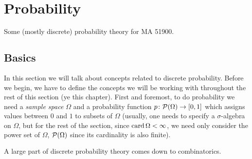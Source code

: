 \chapter{Probability}
Some (mostly discrete) probability theory for MA 51900.

\section{Basics}
In this section we will talk about concepts related to discrete
probability. Before we begin, we have to define the concepts we will be
working with throughout the rest of this section (ye this chapter). First
and foremost, to do probability we need a \emph{sample space \(\Omega\)}
and a probability function \(p\colon\mathcal{P}(\Omega)\to[0,1]\) which assigns
values between \(0\) and \(1\) to subsets of \(\Omega\) (usually, one needs
to specify a \(\sigma\)-algebra on \(\Omega\), but for the rest of the
section, since \(\operatorname{card}\Omega<\infty\), we need only consider the power set
of \(\Omega\), \(\mathcal{P}(\Omega)\) since its cardinality is also finite).


A large part of discrete probability theory comes down to combinatorics.

